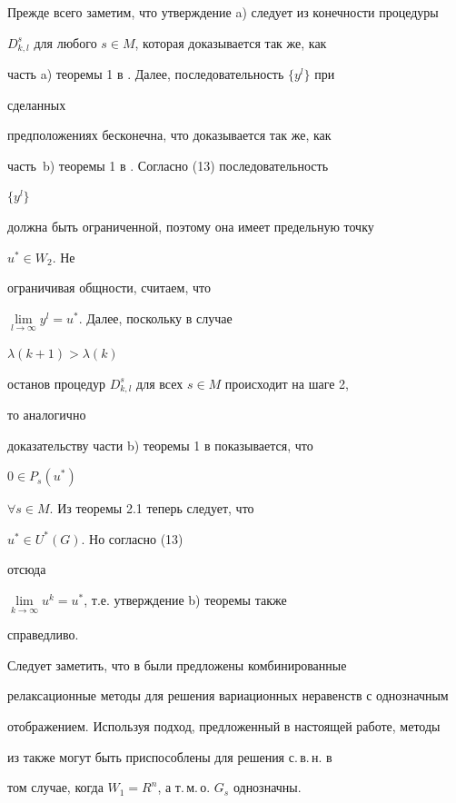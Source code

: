 \begin{pf}


Прежде всего заметим, что утверждение a) следует из конечности процедуры


$D^s_{k,l}$ для любого $s\in M$, которая доказывается так же, как


часть a) теоремы 1 в \cite{Kon1}. Далее, последовательность $\{y^l\}$ при


сделанных


предположениях бесконечна, что доказывается так же, как


часть~b) теоремы 1 в \cite{Kon1}. Согласно (13) последовательность


$\{y^l\}$


должна быть ограниченной, поэтому она имеет предельную точку


$u^*\in W_2$. Не


ограничивая общности, считаем, что


$\lim\limits_{l\to\infty}y^l=u^*$. Далее, поскольку в случае


$\lambda(k+1)>\lambda(k)$


останов процедур $D^s_{k,l}$ для всех $s\in M$ происходит на шаге 2,


то аналогично


доказательству части b) теоремы 1 в \cite{Kon1} показывается, что


$0\in P_s(u^*)$


$\forall s\in M$. Из теоремы 2.1 теперь следует, что


$u^*\in U^*(G)$. Но согласно (13)


отсюда


$\lim\limits_{k\to\infty}u^k=u^*$, т.е. утверждение b) теоремы также


справедливо.


\end{pf}





Следует заметить, что в \cite{Kon4} были предложены комбинированные


релаксационные методы для решения вариационных неравенств с однозначным


отображением. Используя подход, предложенный в настоящей работе, методы


из \cite{Kon4} также могут быть приспособлены для решения с.\,в.\,н. в


том случае, когда $W_1=R^n$, а т.\,м.\,о. $G_s$ однозначны.





